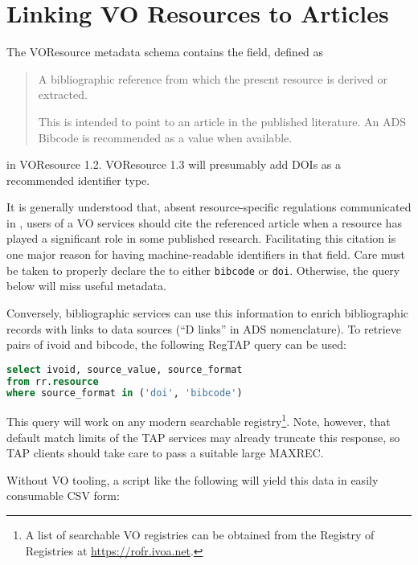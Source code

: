 \documentclass[11pt,a4paper]{ivoa}
\begin{document}
\section{Linking VO Resources to Articles}

The VOResource metadata schema \citep{2018ivoa.spec.0625P} contains the
 field, defined as

\begin{quotation}
\noindent A bibliographic reference from which the present resource is
derived or extracted.

\noindent This is intended to point to an article in the published
literature. An ADS Bibcode is recommended as a value when available.
\end{quotation}

\noindent in VOResource 1.2.  VOResource 1.3 will presumably add DOIs as a
recommended identifier type.

It is generally understood that, absent resource-specific regulations
communicated in , users of a VO services should cite the
referenced article when a resource has played a significant role in some
published research.  Facilitating this citation is one major reason for
having machine-readable identifiers in that field.  Care must be taken
to properly declare the  to either \verb|bibcode|
or \verb|doi|. Otherwise, the query below will miss useful metadata.

Conversely, bibliographic services can use this information to enrich
bibliographic records with links to data sources (``D links'' in ADS
nomenclature).  To retrieve pairs of ivoid and bibcode, the following
RegTAP \citep{2019ivoa.spec.1011D} query can be used:

\begin{lstlisting}[language=SQL]
select ivoid, source_value, source_format
from rr.resource
where source_format in ('doi', 'bibcode')
\end{lstlisting}

This query will work on any modern searchable registry\footnote{A list
of searchable VO registries can be obtained from the Registry of
Registries at \url{https://rofr.ivoa.net}.}.  Note, however, that
default match limits of the TAP services may already truncate this
response, so TAP clients should take care to pass a suitable large
MAXREC.

Without VO tooling, a script like the following will yield this data in
easily consumable CSV form:
\end{document}
